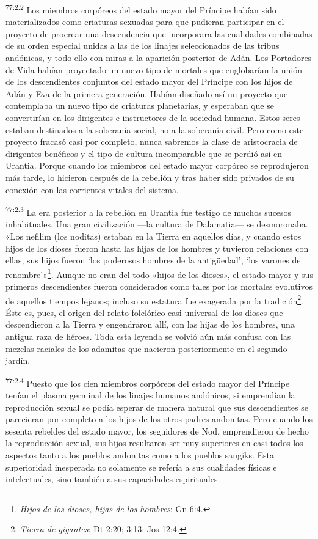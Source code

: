 \par
\textsuperscript{77:2.2} Los miembros corpóreos del estado mayor del Príncipe habían sido materializados como criaturas sexuadas para que pudieran participar en el proyecto de procrear una descendencia que incorporara las cualidades combinadas de su orden especial unidas a las de los linajes seleccionados de las tribus andónicas, y todo ello con miras a la aparición posterior de Adán. Los Portadores de Vida habían proyectado un nuevo tipo de mortales que englobarían la unión de los descendientes conjuntos del estado mayor del Príncipe con los hijos de Adán y Eva de la primera generación. Habían diseñado así un proyecto que contemplaba un nuevo tipo de criaturas planetarias, y esperaban que se convertirían en los dirigentes e instructores de la sociedad humana. Estos seres estaban destinados a la soberanía social, no a la soberanía civil. Pero como este proyecto fracasó casi por completo, nunca sabremos la clase de aristocracia de dirigentes benéficos y el tipo de cultura incomparable que se perdió así en Urantia. Porque cuando los miembros del estado mayor corpóreo se reprodujeron más tarde, lo hicieron después de la rebelión y tras haber sido privados de su conexión con las corrientes vitales del sistema.

\par
\textsuperscript{77:2.3} La era posterior a la rebelión en Urantia fue testigo de muchos sucesos inhabituales. Una gran civilización ---la cultura de Dalamatia--- se desmoronaba. «Los nefilim (los noditas) estaban en la Tierra en aquellos días, y cuando estos hijos de los dioses fueron hasta las hijas de los hombres y tuvieron relaciones con ellas, sus hijos fueron `los poderosos hombres de la antig\"uedad', `los varones de renombre'»\footnote{\textit{Hijos de los dioses, hijas de los hombres}: Gn 6:4.}. Aunque no eran del todo «hijos de los dioses», el estado mayor y sus primeros descendientes fueron considerados como tales por los mortales evolutivos de aquellos tiempos lejanos; incluso su estatura fue exagerada por la tradición\footnote{\textit{Tierra de gigantes}: Dt 2:20; 3:13; Jos 12:4.}. Éste es, pues, el origen del relato folclórico casi universal de los dioses que descendieron a la Tierra y engendraron allí, con las hijas de los hombres, una antigua raza de héroes. Toda esta leyenda se volvió aún más confusa con las mezclas raciales de los adamitas que nacieron posteriormente en el segundo jardín.

\par
\textsuperscript{77:2.4} Puesto que los cien miembros corpóreos del estado mayor del Príncipe tenían el plasma germinal de los linajes humanos andónicos, si emprendían la reproducción sexual se podía esperar de manera natural que sus descendientes se parecieran por completo a los hijos de los otros padres andonitas. Pero cuando los sesenta rebeldes del estado mayor, los seguidores de Nod, emprendieron de hecho la reproducción sexual, sus hijos resultaron ser muy superiores en casi todos los aspectos tanto a los pueblos andonitas como a los pueblos sangiks. Esta superioridad inesperada no solamente se refería a sus cualidades físicas e intelectuales, sino también a sus capacidades espirituales.

